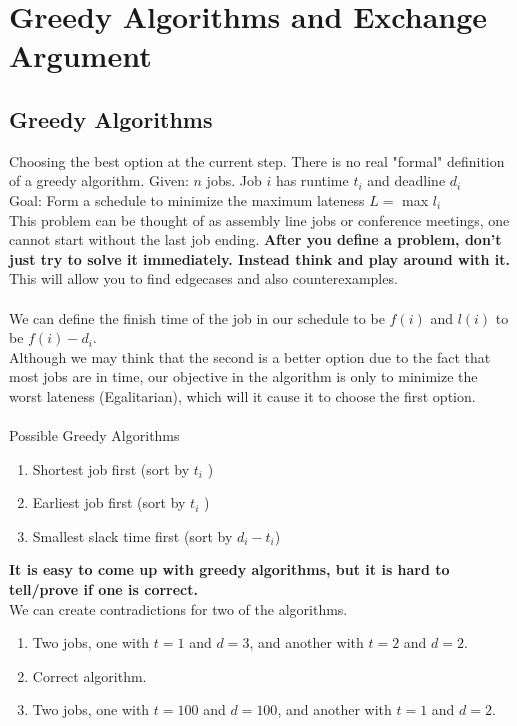 \documentclass[oneside]{book}
\begin{document}
\chapter{Greedy Algorithms and Exchange Argument}
\section{Greedy Algorithms}
 {
    Choosing the best option at the current step. There is no real "formal" definition of a greedy algorithm.
}
 {
    Given: $n$ jobs. Job $i$ has runtime $t_i$ and deadline $d_i$ \\
    Goal: Form a schedule to minimize the maximum lateness $L = $ max $l_i$\\
    This problem can be thought of as assembly line jobs or conference meetings, one cannot start without the last job ending.
}
\textbf{After you define a problem, don't just try to solve it immediately. Instead think and play around with it.} This will allow you to find edgecases and also counterexamples.
\\\\
We can define the finish time of the job in our schedule to be $f(i)$ and $l(i)$ to be $f(i) - d_i$.\\
Although we may think that the second is a better option due to the fact that most jobs are in time, our objective in the algorithm is only to minimize the worst lateness (Egalitarian), which will it cause it to choose the first option.
\\\\
Possible Greedy Algorithms
\begin{enumerate}
    \item Shortest job first (sort by $t_i$ )
    \item Earliest job first (sort by $t_i$ )
    \item Smallest slack time first (sort by $d_i - t_i$)
\end{enumerate}
\textbf{It is easy to come up with greedy algorithms, but it is hard to tell/prove if one is correct.}
\\ 
We can create contradictions for two of the algorithms.
\begin{enumerate}
    \item Two jobs, one with $t = 1$ and $d = 3$, and another with $t = 2$ and $d = 2$.
    \item Correct algorithm.
    \item Two jobs, one with $ t = 100$ and $d = 100$, and another with $t = 1$ and $d = 2$.
\end{enumerate}
\end{document}
